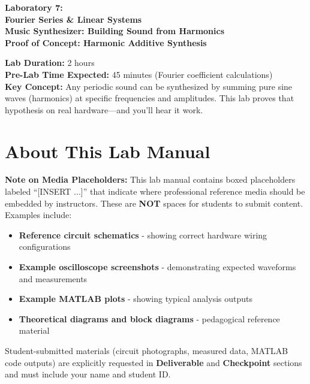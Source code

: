 \documentclass[11pt,letterpaper]{article}
\begin{document}
\begin{center}
\huge{\bf Laboratory 7:}\\
\vspace{0.2in}
\Large{\bf Fourier Series \& Linear Systems}\\
\Large{\bf Music Synthesizer: Building Sound from Harmonics}\\
\vspace{0.2in}
\normalsize{\bf Proof of Concept: Harmonic Additive Synthesis}
\end{center}

\vspace{0.3in}
\noindent
\textbf{Lab Duration:} 2 hours\\
\textbf{Pre-Lab Time Expected:} 45 minutes (Fourier coefficient calculations)\\
\textbf{Key Concept:} Any periodic sound can be synthesized by summing pure sine waves (harmonics) at specific frequencies and amplitudes. This lab proves that hypothesis on real hardware—and you'll hear it work.

\tableofcontents
\clearpage

\section*{About This Lab Manual}

\textbf{Note on Media Placeholders:} This lab manual contains boxed placeholders labeled ``[INSERT ...]'' that indicate where professional reference media should be embedded by instructors. These are \textbf{NOT} spaces for students to submit content. Examples include:

\begin{itemize}
    \item \textbf{Reference circuit schematics} - showing correct hardware wiring configurations
    \item \textbf{Example oscilloscope screenshots} - demonstrating expected waveforms and measurements
    \item \textbf{Example MATLAB plots} - showing typical analysis outputs
    \item \textbf{Theoretical diagrams and block diagrams} - pedagogical reference material
\end{itemize}

\noindent Student-submitted materials (circuit photographs, measured data, MATLAB code outputs) are explicitly requested in \textbf{Deliverable} and \textbf{Checkpoint} sections and must include your name and student ID.
\end{document}
